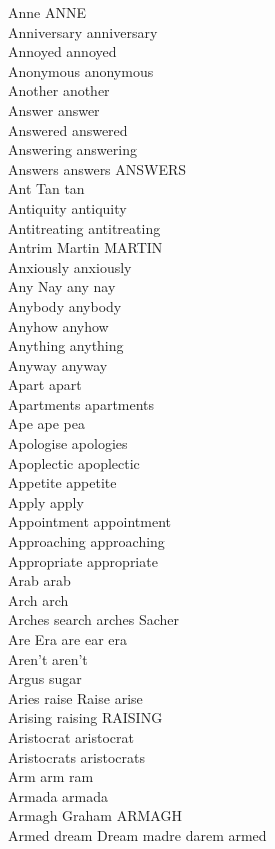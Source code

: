Anne ANNE\\
Anniversary anniversary\\
Annoyed annoyed\\
Anonymous anonymous\\
Another another\\
Answer answer\\
Answered answered\\
Answering answering\\
Answers answers ANSWERS\\
Ant Tan tan\\
Antiquity antiquity\\
Antitreating antitreating\\
Antrim Martin MARTIN\\
Anxiously anxiously\\
Any Nay any nay\\
Anybody anybody\\
Anyhow anyhow\\
Anything anything\\
Anyway anyway\\
Apart apart\\
Apartments apartments\\
Ape ape pea\\
Apologise apologies\\
Apoplectic apoplectic\\
Appetite appetite\\
Apply apply\\
Appointment appointment\\
Approaching approaching\\
Appropriate appropriate\\
Arab arab\\
Arch arch\\
Arches search arches Sacher\\
Are Era are ear era\\
Aren't aren't\\
Argus sugar\\
Aries raise Raise arise\\
Arising raising RAISING\\
Aristocrat aristocrat\\
Aristocrats aristocrats\\
Arm arm ram\\
Armada armada\\
Armagh Graham ARMAGH\\
Armed dream Dream madre darem armed\\
